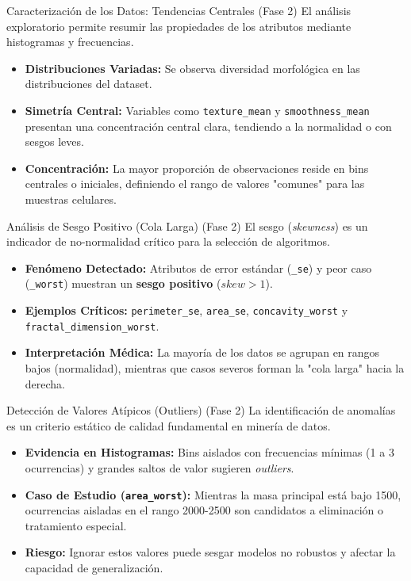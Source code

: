 \documentclass{beamer}
\begin{document}
	\begin{frame}{Caracterización de los Datos: Tendencias Centrales (Fase 2)}
		El análisis exploratorio permite resumir las propiedades de los atributos mediante histogramas y frecuencias.
		\begin{itemize}
			\item<2-> \textbf{Distribuciones Variadas:} Se observa diversidad morfológica en las distribuciones del dataset.
			\item<3-> \textbf{Simetría Central:} Variables como \texttt{texture\_mean} y \texttt{smoothness\_mean} presentan una concentración central clara, tendiendo a la normalidad o con sesgos leves.
			\item<4-> \textbf{Concentración:} La mayor proporción de observaciones reside en bins centrales o iniciales, definiendo el rango de valores "comunes" para las muestras celulares.
		\end{itemize}
	\end{frame}
	
	\begin{frame}{Análisis de Sesgo Positivo (Cola Larga) (Fase 2)}
		El sesgo (\textit{skewness}) es un indicador de no-normalidad crítico para la selección de algoritmos.
		\begin{itemize}
			\item<2-> \textbf{Fenómeno Detectado:} Atributos de error estándar (\texttt{\_se}) y peor caso (\texttt{\_worst}) muestran un \textbf{sesgo positivo} ($skew > 1$).
			\item<3-> \textbf{Ejemplos Críticos:} \texttt{perimeter\_se}, \texttt{area\_se}, \texttt{concavity\_worst} y \texttt{fractal\_dimension\_worst}.
			\item<4-> \textbf{Interpretación Médica:} La mayoría de los datos se agrupan en rangos bajos (normalidad), mientras que casos severos forman la "cola larga" hacia la derecha.
		\end{itemize}
	\end{frame}
	
	\begin{frame}{Detección de Valores Atípicos (Outliers) (Fase 2)}
		La identificación de anomalías es un criterio estático de calidad fundamental en minería de datos.
		\begin{itemize}
			\item<2-> \textbf{Evidencia en Histogramas:} Bins aislados con frecuencias mínimas (1 a 3 ocurrencias) y grandes saltos de valor sugieren \textit{outliers}.
			\item<3-> \textbf{Caso de Estudio (\texttt{area\_worst}):} Mientras la masa principal está bajo 1500, ocurrencias aisladas en el rango 2000-2500 son candidatos a eliminación o tratamiento especial.
			\item<4-> \textbf{Riesgo:} Ignorar estos valores puede sesgar modelos no robustos y afectar la capacidad de generalización.
		\end{itemize}
	\end{frame}
	
\end{document}
